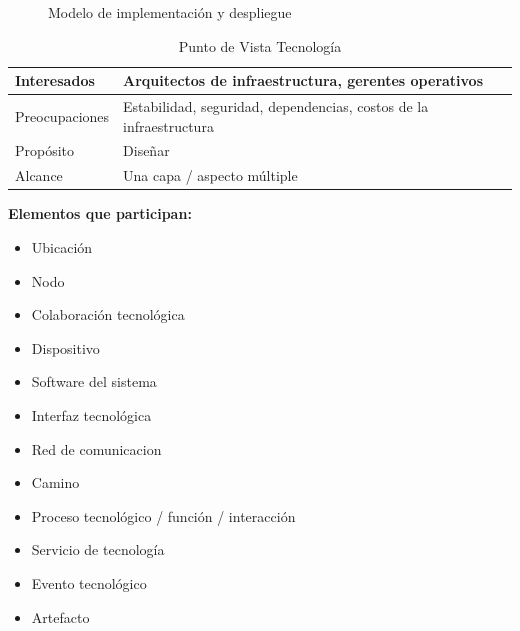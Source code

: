 \begin{figure}[h]
	\centering
	\caption{Modelo de implementación y despliegue}
\end{figure}



\begin{table}[h]
	\begin{center}
		\begin{tabular}{ | m{7em} | m{8cm}|  } 
			\hline
			Interesados & Arquitectos de infraestructura, gerentes operativos 
			\\
			\hline
			Preocupaciones & Estabilidad, seguridad, dependencias, costos de la infraestructura
			\\
			\hline
			Propósito & Diseñar
			\\
			\hline
			Alcance & Una capa / aspecto múltiple
			\\
			\hline
		\end{tabular}
		\caption{Punto de Vista Tecnología}
		\label{tab:concepts}
	\end{center}
\end{table}

\textbf{Elementos que participan: }
\begin{itemize}
	\item Ubicación
	\item Nodo
	\item Colaboración tecnológica
	\item Dispositivo
	\item Software del sistema
	\item Interfaz tecnológica
	\item Red de comunicacion
	\item Camino
	\item Proceso tecnológico / función / interacción
	\item Servicio de tecnología
	\item Evento tecnológico
	\item Artefacto
\end{itemize}